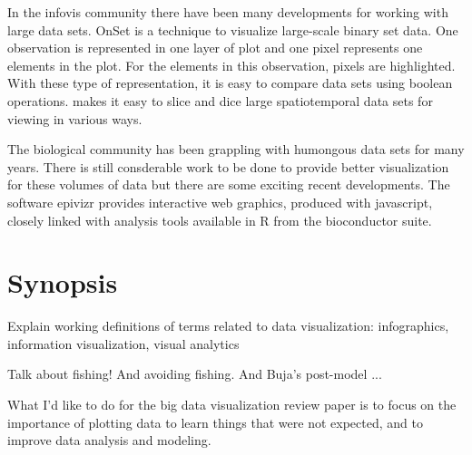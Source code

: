 \documentclass{article}
\begin{document}
In the infovis community there have been many developments for working with large data sets. OnSet\citep{sadana2014onset} is a technique to visualize large-scale binary set data. One observation is represented in one layer of plot and one pixel represents one elements in the plot. For the elements in this observation, pixels are highlighted. With these type of representation, it is easy to compare data sets using boolean operations. \citet{nanocubes} makes it easy to slice and dice large spatiotemporal data sets for viewing in various ways. 

The biological community has been grappling with humongous data sets for many years. There is still consderable work to be done to provide better visualization for these volumes of data but there are some exciting recent developments. The software epivizr \citep{epivizr} provides interactive web graphics, produced with javascript, closely linked with analysis tools available in R from the bioconductor suite. 


	
	

\section{Synopsis}

Explain working definitions of terms related to data visualization: infographics, information visualization, visual analytics

Talk about fishing! And avoiding fishing. And Buja's post-model ...

What I'd like to do for the big data visualization review paper is to focus on the importance of plotting data to learn things that were not expected, and to improve data analysis and modeling.
\end{document}
